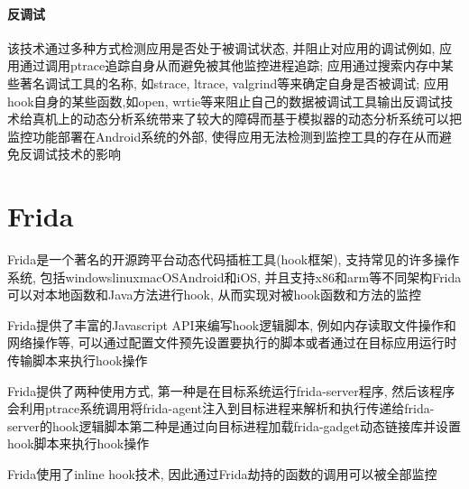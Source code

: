 \paragraph*{反调试}
该技术通过多种方式检测应用是否处于被调试状态, 并阻止对应用的调试\juhao 例如, 应用通过调用ptrace追踪自身从而避免被其他监控进程追踪; 应用通过搜索内存中某些著名调试工具的名称, 如strace, ltrace, valgrind等来确定自身是否被调试; 应用hook自身的某些函数,如open, wrtie等来阻止自己的数据被调试工具输出\juhao 反调试技术给真机上的动态分析系统带来了较大的障碍而基于模拟器的动态分析系统可以把监控功能部署在Android系统的外部, 使得应用无法检测到监控工具的存在从而避免反调试技术的影响\juhao 

\section{Frida}
Frida是一个著名的开源跨平台动态代码插桩工具(hook框架), 支持常见的许多操作系统, 包括windows\dunhao linux\dunhao macOS\dunhao Android和iOS, 并且支持x86和arm等不同架构\juhao Frida可以对本地函数和Java方法进行hook, 从而实现对被hook函数和方法的监控\juhao 

Frida提供了丰富的Javascript API来编写hook逻辑脚本, 例如内存读取\dunhao 文件操作和网络操作等, 可以通过配置文件预先设置要执行的脚本或者通过在目标应用运行时传输脚本来执行hook操作\juhao 

Frida提供了两种使用方式, 第一种是在目标系统运行frida-server程序, 然后该程序会利用ptrace系统调用将frida-agent注入到目标进程来解析和执行传递给frida-server的hook逻辑脚本\juhao 第二种是通过向目标进程加载frida-gadget动态链接库并设置hook脚本来执行hook操作\juhao 

Frida使用了inline hook技术, 因此通过Frida劫持的函数的调用可以被全部监控\juhao 





